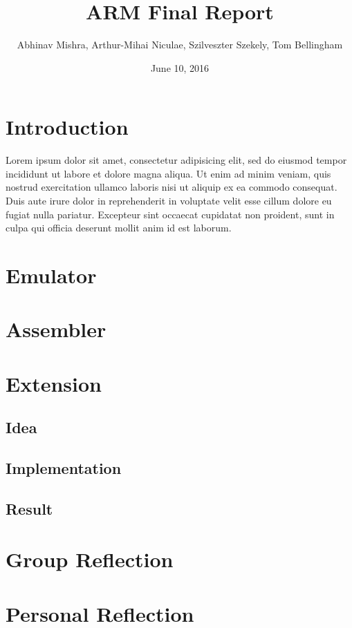 \documentclass[11pt]{article}
\begin{document}
\title{ARM Final Report}
\author{Abhinav Mishra, Arthur-Mihai Niculae,
	 Szilveszter Szekely, Tom Bellingham}
\date{June 10, 2016}

\maketitle

\section{Introduction}

Lorem ipsum dolor sit amet, consectetur adipisicing elit, sed do eiusmod tempor
incididunt ut labore et dolore magna aliqua. Ut enim ad minim veniam, quis
nostrud exercitation ullamco laboris nisi ut aliquip ex ea commodo consequat.
Duis aute irure dolor in reprehenderit in voluptate velit esse cillum dolore eu
fugiat nulla pariatur. Excepteur sint occaecat cupidatat non proident, sunt in
culpa qui officia deserunt mollit anim id est laborum.

\section{Emulator}
\section{Assembler}
\section{Extension}
\subsection{Idea}
\subsection{Implementation}
\subsection{Result}
\section{Group Reflection}
\section{Personal Reflection}
\end{document}
